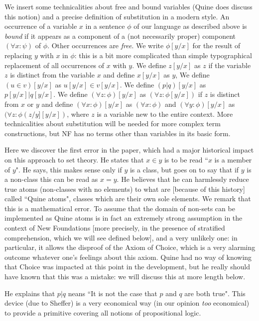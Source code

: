 \documentclass[12pt]{article}
\begin{document}
We insert some technicalities about free and bound variables (Quine does discuss this notion) and a precise definition of substitution in a modern style.  An occurrence of a variable $x$ in a sentence $\phi$ of our language as described above is {\em bound\/} if it appears as a component of a (not necessarily proper) component $(\forall x:\psi)$ of $\phi$.  Other occurrences are {\em free\/}.  We write $\phi[y/x]$ for the result of replacing $y$ with $x$ in $\phi$:  this is a bit more complicated than simple typographical replacement of all occurrences of $x$ with $y$.  We define $z[y/x]$ as $z$ if the variable $z$ is distinct from the variable $x$ and define $x[y/x]$ as $y$,  We define $(u \in v)[y/x]$ as $u[y/x] \in v[y/x]$.  We define $(p|q)[y/x]$ as $p[y/x]|q[y/x]$.
We define $(\forall z:\phi)[y/x]$ as $(\forall z:\phi[y/x])$ if $z$ is distinct from $x$ or $y$ and define  $(\forall x:\phi)[y/x]$ as
$(\forall x:\phi)$ and $(\forall y:\phi)[y/x]$ as $(\forall z:\phi(z/y][y/x])$, where $z$ is a variable new to the entire context.   
More technicalities about substitution will be needed for more complex term constructions, but NF has no terms other than variables in its basic form.

Here we discover the first error in the paper, which had a major historical impact on this approach to set theory.  He states that $x \in y$ is to be read ``$x$ is a member of $y$".  He says, this makes sense only if $y$ is a class, but goes on to say that if $y$ is a non-class this can be read as $x=y$.  He believes that he can harmlessly reduce true atoms (non-classes with no elements) to
what are [because of this history] called ``Quine atoms", classes which are their own sole elements.  We remark that this is a mathematical error.  To assume that the domain of non-sets can be implemented as Quine atoms is in fact an extremely strong assumption in the context of New Foundations [more precisely, in the presence of stratified comprehension, which we will see defined below], and a very unlikely one:  in particular, it allows the disproof of the Axiom of Choice, which is a very alarming outcome whatever one's feelings about this axiom.  Quine had no way of knowing that Choice was impacted at this point in the development, but he really should have known that this was a mistake:  we will discuss this at more length below.

He explains that $p|q$ neans ``It is not the case that $p$ and $q$ are both true".  This device (due to Sheffer) is a very economical way (in our opinion {\em too\/} economical) to provide a primitive covering all notions of propositional logic.
\end{document}
